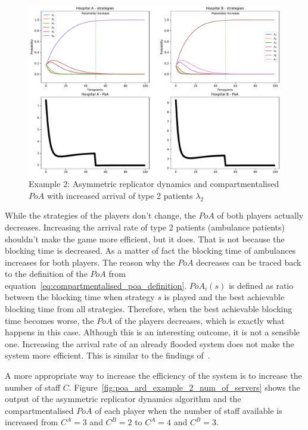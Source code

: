 \begin{figure}[H]
    \centering
    \includegraphics[width=\linewidth]{chapters/05_numerical_results/Bin/example_2/poa_ard_example_2_lambda_2.pdf}
    \caption{Example 2: Asymmetric replicator dynamics and compartmentalised
    \(PoA\) with increased arrival of type 2 patients \(\lambda_2\)}
    \label{fig:poa_ard_example_2_lambda_2}
\end{figure}

While the strategies of the players don't change, the \(PoA\) of both players
actually decreases.
Increasing the arrival rate of type 2 patients (ambulance patients) shouldn't
make the game more efficient, but it does.
That is not because the blocking time is decreased.
As a matter of fact the blocking time of ambulances increases for both players.
The reason why the \(PoA\) decreases can be traced back to the definition of the
\(PoA\) from equation~\eqref{eq:compartmentalised_poa_definition}.
\(PoA_i(s)\) is defined as ratio between the blocking time when strategy \(s\)
is played and the best achievable blocking time from all strategies.
Therefore, when the best achievable blocking time becomes worse, the \(PoA\) of
the players decreases, which is exactly what happens in this case.
Although this is an interesting outcome, it is not a sensible one.
Increasing the arrival rate of an already flooded system does not make the
system more efficient.
This is similar to the findings of~\cite{knight_measuring_poa}.

A more appropriate way to increase the efficiency of the system is to increase
the number of staff \(C\).
Figure~\ref{fig:poa_ard_example_2_num_of_servers} shows the output of the
asymmetric replicator dynamics algorithm and the compartmentalised \(PoA\) of
each player when the number of staff available is increased from \(C^A = 3\)
and \(C^B = 2\) to \(C^A = 4\) and \(C^B = 3\).

